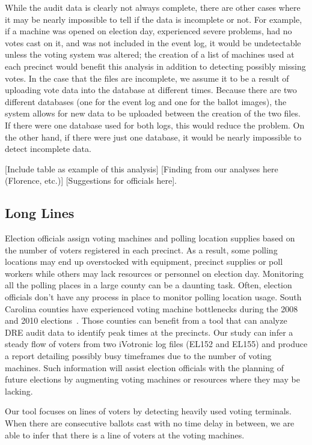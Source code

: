 While the audit data is clearly not always complete, there are other cases where it may be nearly impossible to tell if the data is incomplete or not.  For example, if a machine was opened on election day, experienced severe problems, had no votes cast on it, and was not included in the event log, it would be undetectable unless the voting system was altered; the creation of a list of machines used at each precinct would benefit this analysis in addition to detecting possibly missing votes.  In the case that the files are incomplete, we assume it to be a result of uploading vote data into the database at different times.  Because there are two different databases (one for the event log and one for the ballot images), the system allows for new data to be uploaded between the creation of the two files.  If there were one database used for both logs, this would reduce the problem.  On the other hand, if there were just one database, it would be nearly impossible to detect incomplete data.  

[Include table as example of this analysis] [Finding from our analyses here (Florence, etc.)] [Suggestions for officials here].

\subsection{Long Lines}

Election officials assign voting machines and polling location supplies based on the number of voters registered in each precinct.  As a result, some polling locations may end up overstocked with equipment, precinct supplies or poll workers while others may lack resources or personnel on election day. Monitoring all the polling places in a large county can be a daunting task. Often, election officials don't have any process in place to monitor polling location usage. South Carolina counties have experienced voting machine bottlenecks during the 2008 and 2010 elections~\cite{Kreitman2010, Slade2008, U2010}.  Those counties can benefit from a tool that can analyze DRE audit data to identify peak times at the precincts.  Our study can infer a steady flow of voters from two iVotronic log files (EL152 and EL155) and produce a report detailing possibly busy timeframes due to the number of voting machines. Such information will assist election officials with the planning of future elections by augmenting voting machines or resources where they may be lacking.

Our tool focuses on lines of voters by detecting heavily used voting terminals. When there are consecutive ballots cast with no time delay in between, we are able to infer that there is a line of voters at the voting machines. 

